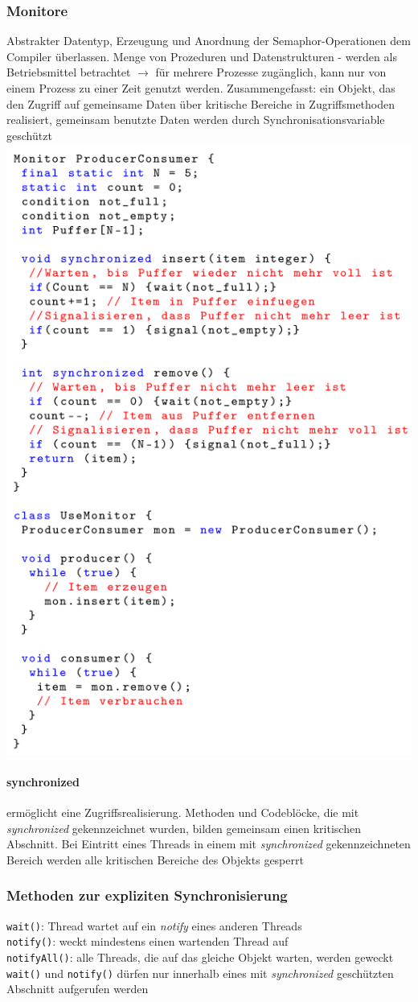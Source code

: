 \documentclass[11pt,a4paper,landscape]{article}
\begin{document}
\begin{multicols*}{3}
	\subsubsection{Monitore}
	Abstrakter Datentyp, Erzeugung und Anordnung der Semaphor-Operationen dem Compiler überlassen. Menge von Prozeduren und Datenstrukturen - werden als Betriebsmittel betrachtet $\rightarrow$ für mehrere Prozesse zugänglich, kann nur von einem Prozess zu einer Zeit genutzt werden. Zusammengefasst: ein Objekt, das den Zugriff auf gemeinsame Daten über kritische Bereiche in Zugriffsmethoden realisiert, gemeinsam benutzte Daten werden durch Synchronisationsvariable geschützt\\
	\includegraphics[width=0.65\columnwidth]{monitor}
	\paragraph{synchronized} ermöglicht eine Zugriffsrealisierung. Methoden und Codeblöcke, die mit \textit{synchronized} gekennzeichnet wurden, bilden gemeinsam einen kritischen Abschnitt. Bei Eintritt eines Threads in einem mit \textit{synchronized} gekennzeichneten Bereich werden alle kritischen Bereiche des Objekts gesperrt
	\subsubsection{Methoden zur expliziten Synchronisierung}
	\texttt{wait()}: Thread wartet auf ein \textit{notify} eines anderen Threads\\
	\texttt{notify()}: weckt mindestens einen wartenden Thread auf \\
	\texttt{notifyAll()}: alle Threads, die auf das gleiche Objekt warten, werden geweckt\\
	\texttt{wait()} und \texttt{notify()} dürfen nur innerhalb eines mit \textit{synchronized} geschützten Abschnitt aufgerufen werden

\end{multicols*}
\end{document}
